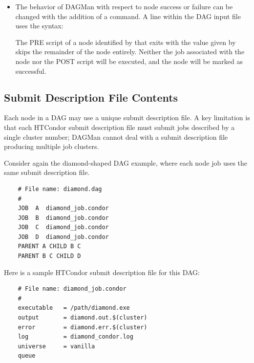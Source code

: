 \begin{itemize}
\label{dagman:PRE-SKIP}
\item {}

The behavior of DAGMan with respect to node success or failure can
be changed with the addition of a  command. 
A  line within the DAG input file uses the syntax: 

  

The PRE script of a node identified by  that exits with the value 
given by 
skips the remainder of the node entirely.  
Neither the job associated with the node nor
the POST script will be executed,
and the node will be marked as successful.


\end{itemize}



\subsection{Submit Description File Contents}

Each node in a DAG may use a unique submit description file.
A key limitation is that
each HTCondor submit description file must submit jobs
described by a single cluster number;
DAGMan cannot deal with a submit description file producing
multiple job clusters.

Consider again the diamond-shaped DAG example, 
where each node job uses the same submit description file.

\begin{verbatim}
    # File name: diamond.dag
    #
    JOB  A  diamond_job.condor 
    JOB  B  diamond_job.condor 
    JOB  C  diamond_job.condor	
    JOB  D  diamond_job.condor
    PARENT A CHILD B C
    PARENT B C CHILD D
\end{verbatim}

Here is a sample HTCondor submit description file
for this DAG:

\begin{verbatim}
    # File name: diamond_job.condor
    #
    executable   = /path/diamond.exe
    output       = diamond.out.$(cluster)
    error        = diamond.err.$(cluster)
    log          = diamond_condor.log
    universe     = vanilla
    queue
\end{verbatim}

